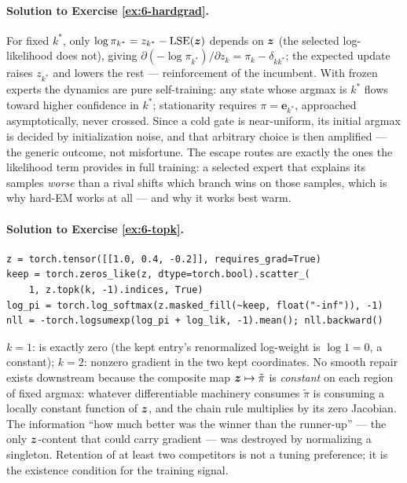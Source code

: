 \paragraph{Solution to Exercise \ref{ex:6-hardgrad}.}
For fixed $k^\ast$, only $\log\pi_{k^\ast} = z_{k^\ast} - \operatorname{LSE}(\bm{z})$
depends on $\bm{z}$ (the selected log-likelihood does not), giving
$\partial(-\log\pi_{k^\ast})/\partial z_k = \pi_k - \delta_{kk^\ast}$;
the expected update raises $z_{k^\ast}$ and lowers the rest ---
reinforcement of the incumbent. With frozen experts the dynamics are
pure self-training: any state whose argmax is $k^\ast$ flows toward
higher confidence in $k^\ast$; stationarity requires $\pi =
\bm{e}_{k^\ast}$, approached asymptotically, never crossed. Since a
cold gate is near-uniform, its initial argmax is decided by
initialization noise, and that arbitrary choice is then amplified ---
the generic outcome, not misfortune. The escape routes are exactly the
ones the likelihood term provides in full training: a selected expert
that explains its samples \emph{worse} than a rival shifts which branch
wins on those samples, which is why hard-EM works at all --- and why
it works best warm.

\paragraph{Solution to Exercise \ref{ex:6-topk}.}
\begin{lstlisting}
z = torch.tensor([[1.0, 0.4, -0.2]], requires_grad=True)
keep = torch.zeros_like(z, dtype=torch.bool).scatter_(
    1, z.topk(k, -1).indices, True)
log_pi = torch.log_softmax(z.masked_fill(~keep, float("-inf")), -1)
nll = -torch.logsumexp(log_pi + log_lik, -1).mean(); nll.backward()
\end{lstlisting}
$k = 1$:  is exactly zero (the kept entry's renormalized
log-weight is $\log 1 = 0$, a constant); $k = 2$: nonzero gradient in
the two kept coordinates. No smooth repair exists downstream because
the composite map $\bm{z} \mapsto \tilde\pi$ is \emph{constant} on each
region of fixed argmax: whatever differentiable machinery consumes
$\tilde\pi$ is consuming a locally constant function of $\bm{z}$, and the
chain rule multiplies by its zero Jacobian. The information ``how much
better was the winner than the runner-up'' --- the only $\bm{z}$-content
that could carry gradient --- was destroyed by normalizing a singleton.
Retention of at least two competitors is not a tuning preference; it is
the existence condition for the training signal.

